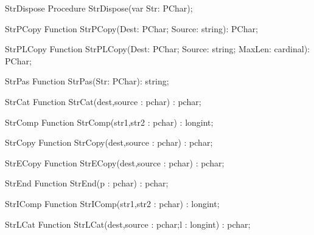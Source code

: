 
\begin{procedure}{StrDispose}
\Declaration
Procedure StrDispose(var Str: PChar);
\Description
\Errors
\SeeAlso
\end{procedure}

 
\begin{function}{StrPCopy}
\Declaration
Function StrPCopy(Dest: PChar; Source: string): PChar;
\Description
\Errors
\SeeAlso
\end{function}

 
\begin{function}{StrPLCopy}
\Declaration
Function StrPLCopy(Dest: PChar; Source: string; MaxLen: cardinal): PChar;
\Description
\Errors
\SeeAlso
\end{function}

 
\begin{function}{StrPas}
\Declaration
Function StrPas(Str: PChar): string;
\Description
\Errors
\SeeAlso
\end{function}

 
\begin{function}{StrCat}
\Declaration
Function StrCat(dest,source : pchar) : pchar;
\Description
\Errors
\SeeAlso
\end{function}

 
\begin{function}{StrComp}
\Declaration
Function StrComp(str1,str2 : pchar) : longint;
\Description
\Errors
\SeeAlso
\end{function}

 
\begin{function}{StrCopy}
\Declaration
Function StrCopy(dest,source : pchar) : pchar;
\Description
\Errors
\SeeAlso
\end{function}

 
\begin{function}{StrECopy}
\Declaration
Function StrECopy(dest,source : pchar) : pchar;
\Description
\Errors
\SeeAlso
\end{function}

 
\begin{function}{StrEnd}
\Declaration
Function StrEnd(p : pchar) : pchar;
\Description
\Errors
\SeeAlso
\end{function}

 
\begin{function}{StrIComp}
\Declaration
Function StrIComp(str1,str2 : pchar) : longint;
\Description
\Errors
\SeeAlso
\end{function}

 
\begin{function}{StrLCat}
\Declaration
Function StrLCat(dest,source : pchar;l : longint) : pchar;
\Description
\Errors
\SeeAlso
\end{function}

